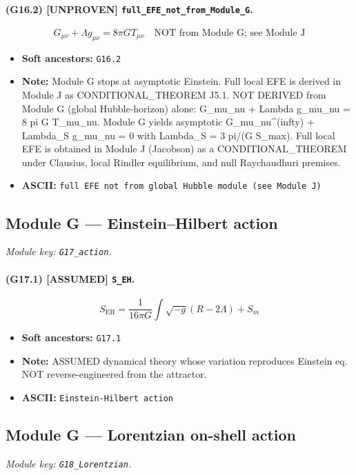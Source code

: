 \documentclass[11pt,a4paper]{article}
\theoremstyle{remark}\newtheorem*{caution}{Caution}
\newcommand{\tagbox}[1]{\textsc{[#1]}}
\begin{document}
\paragraph{(G16.2) \tagbox{UNPROVEN} \texttt{full\_EFE\_not\_from\_Module\_G}.}
\begin{equation}
G_{\mu\nu}+\Lambda g_{\mu\nu}=8\pi G T_{\mu\nu}\quad\text{NOT from Module G; see Module J}
\tag{G16.2}
\end{equation}
\begin{itemize}\setlength{\itemsep}{0.12em}
\item \textbf{Soft ancestors:} \texttt{G16.2}
\item \textbf{Note:} Module G stops at asymptotic Einstein. Full local EFE is derived in Module J as CONDITIONAL\_THEOREM J5.1. NOT DERIVED from Module G (global Hubble-horizon) alone: G\_mu\_nu + Lambda g\_mu\_nu = 8 pi G T\_mu\_nu. Module G yields asymptotic G\_mu\_nu^(infty) + Lambda\_S g\_mu\_nu = 0 with Lambda\_S = 3 pi/(G S\_max). Full local EFE is obtained in Module J (Jacobson) as a CONDITIONAL\_THEOREM under Clausius, local Rindler equilibrium, and null Raychaudhuri premises.
\item \textbf{ASCII:} \texttt{full EFE not from global Hubble module (see Module J)}
\end{itemize}
\subsection{Module G --- Einstein--Hilbert action}
\textit{Module key: \texttt{G17\_action}.}
\paragraph{(G17.1) \tagbox{ASSUMED} \texttt{S\_EH}.}
\begin{equation}
S_{\mathrm{EH}}=\frac{1}{16\pi G}\int\sqrt{-g}(R-2\Lambda)+S_m
\tag{G17.1}
\end{equation}
\begin{itemize}\setlength{\itemsep}{0.12em}
\item \textbf{Soft ancestors:} \texttt{G17.1}
\item \textbf{Note:} ASSUMED dynamical theory whose variation reproduces Einstein eq. NOT reverse-engineered from the attractor.
\item \textbf{ASCII:} \texttt{Einstein-Hilbert action}
\end{itemize}
\subsection{Module G --- Lorentzian on-shell action}
\textit{Module key: \texttt{G18\_Lorentzian}.}
\end{document}
